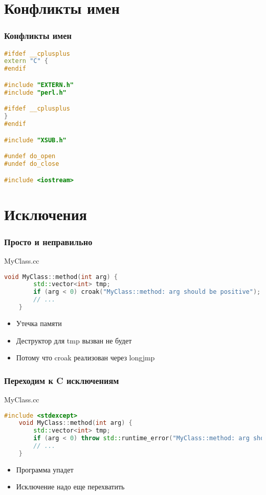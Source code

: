 \documentclass[pdflatex,hyperref={unicode=true}]{beamer}
\DeclareRobustCommand{\cpp}{
    \texorpdfstring{\hbox{C\hspace{-0.5ex}\protect\raisebox{0.5ex}{\protect\scalebox{0.67}{++}}}}{C++}
}
\begin{document}
\section{Конфликты имен}

\begin{frame}[fragile]
    \frametitle{Конфликты имен}
    \begin{lstlisting}[language=C++,style=PerlXS]
#ifdef __cplusplus
extern "C" {
#endif

#include "EXTERN.h"
#include "perl.h"

#ifdef __cplusplus
}
#endif

#include "XSUB.h"

#undef do_open
#undef do_close

#include <iostream>
    \end{lstlisting}
\end{frame}

\section{Исключения}

\begin{frame}[fragile]
    \frametitle{Просто и неправильно}
    MyClass.cc
    \begin{lstlisting}[language=C++,style=PerlXS]
    void MyClass::method(int arg) {
        std::vector<int> tmp;
        if (arg < 0) croak("MyClass::method: arg should be positive");
        // ...
    }
    \end{lstlisting}
    \begin{itemize}
        \item \alert{Утечка} памяти
        \item Деструктор для tmp вызван не будет
        \item Потому что croak реализован через longjmp
    \end{itemize}
\end{frame}

\begin{frame}[fragile]
    \frametitle{Переходим к \cpp исключениям}
    MyClass.cc
    \begin{lstlisting}[language=C++,style=PerlXS]
    #include <stdexcept>
    void MyClass::method(int arg) {
        std::vector<int> tmp;
        if (arg < 0) throw std::runtime_error("MyClass::method: arg should be positive");
        // ...
    }
    \end{lstlisting}
    \begin{itemize}
        \item Программа упадет
        \item Исключение надо еще перехватить
    \end{itemize}
\end{frame}
\end{document}
